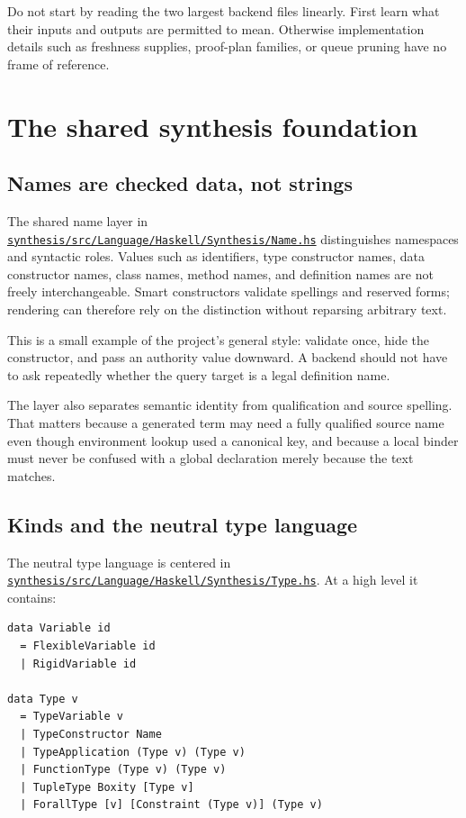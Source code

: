 \documentclass[10pt,letterpaper,oneside]{report}
\def\DjexBase{https://github.com/VladimirReshetnikov/Djex/blob/e454757d53ec057238c22fc6cd0d935b7d96b3dc/}
\newcommand{\dpath}[1]{\href{\DjexBase#1}{\nolinkurl{#1}}}
\begin{document}
Do not start by reading the two largest backend files linearly. First learn what their inputs and outputs are permitted to mean. Otherwise implementation details such as freshness supplies, proof-plan families, or queue pruning have no frame of reference.

\chapter{The shared synthesis foundation}\label{ch:djex-shared}

\section{Names are checked data, not strings}

The shared name layer in \dpath{synthesis/src/Language/Haskell/Synthesis/Name.hs} distinguishes namespaces and syntactic roles. Values such as identifiers, type constructor names, data constructor names, class names, method names, and definition names are not freely interchangeable. Smart constructors validate spellings and reserved forms; rendering can therefore rely on the distinction without reparsing arbitrary text.

This is a small example of the project's general style: validate once, hide the constructor, and pass an authority value downward. A backend should not have to ask repeatedly whether the query target is a legal definition name.

The layer also separates semantic identity from qualification and source spelling. That matters because a generated term may need a fully qualified source name even though environment lookup used a canonical key, and because a local binder must never be confused with a global declaration merely because the text matches.

\section{Kinds and the neutral type language}

The neutral type language is centered in \dpath{synthesis/src/Language/Haskell/Synthesis/Type.hs}. At a high level it contains:

\begin{lstlisting}[language=Haskellish]
data Variable id
  = FlexibleVariable id
  | RigidVariable id

data Type v
  = TypeVariable v
  | TypeConstructor Name
  | TypeApplication (Type v) (Type v)
  | FunctionType (Type v) (Type v)
  | TupleType Boxity [Type v]
  | ForallType [v] [Constraint (Type v)] (Type v)
\end{lstlisting}
\end{document}
